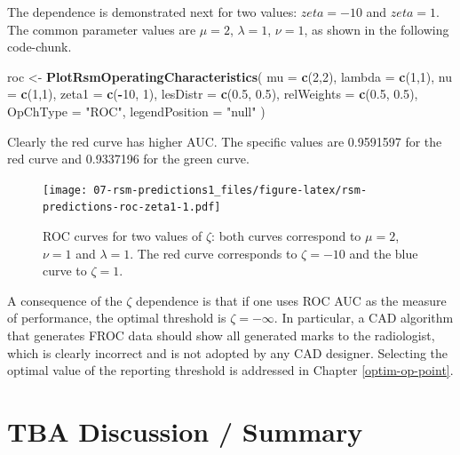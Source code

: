 \documentclass[
]{book}
\newenvironment{Shaded}{\begin{snugshade}}{\end{snugshade}}
\newcommand{\DataTypeTok}[1]{\textcolor[rgb]{0.13,0.29,0.53}{#1}}
\newcommand{\DecValTok}[1]{\textcolor[rgb]{0.00,0.00,0.81}{#1}}
\newcommand{\FloatTok}[1]{\textcolor[rgb]{0.00,0.00,0.81}{#1}}
\newcommand{\KeywordTok}[1]{\textcolor[rgb]{0.13,0.29,0.53}{\textbf{#1}}}
\newcommand{\NormalTok}[1]{#1}
\newcommand{\OperatorTok}[1]{\textcolor[rgb]{0.81,0.36,0.00}{\textbf{#1}}}
\newcommand{\StringTok}[1]{\textcolor[rgb]{0.31,0.60,0.02}{#1}}
\begin{document}
The dependence is demonstrated next for two values: \(zeta = -10\) and \(zeta = 1\). The common parameter values are \(\mu = 2\), \(\lambda = 1\), \(\nu = 1\), as shown in the following code-chunk.

\begin{Shaded}
\begin{Highlighting}[]
\NormalTok{roc <-}\StringTok{ }\KeywordTok{PlotRsmOperatingCharacteristics}\NormalTok{(}
     \DataTypeTok{mu =} \KeywordTok{c}\NormalTok{(}\DecValTok{2}\NormalTok{,}\DecValTok{2}\NormalTok{),}
     \DataTypeTok{lambda =} \KeywordTok{c}\NormalTok{(}\DecValTok{1}\NormalTok{,}\DecValTok{1}\NormalTok{),}
     \DataTypeTok{nu =} \KeywordTok{c}\NormalTok{(}\DecValTok{1}\NormalTok{,}\DecValTok{1}\NormalTok{),}
     \DataTypeTok{zeta1 =} \KeywordTok{c}\NormalTok{(}\OperatorTok{-}\DecValTok{10}\NormalTok{, }\DecValTok{1}\NormalTok{),}
     \DataTypeTok{lesDistr =} \KeywordTok{c}\NormalTok{(}\FloatTok{0.5}\NormalTok{, }\FloatTok{0.5}\NormalTok{),}
     \DataTypeTok{relWeights =} \KeywordTok{c}\NormalTok{(}\FloatTok{0.5}\NormalTok{, }\FloatTok{0.5}\NormalTok{),}
     \DataTypeTok{OpChType =} \StringTok{"ROC"}\NormalTok{,}
     \DataTypeTok{legendPosition =} \StringTok{"null"}
\NormalTok{)}
\end{Highlighting}
\end{Shaded}

Clearly the red curve has higher AUC. The specific values are 0.9591597 for the red curve and 0.9337196 for the green curve.

\begin{figure}
\centering
\texttt{[image: 07-rsm-predictions1\_files/figure-latex/rsm-predictions-roc-zeta1-1.pdf]}
\caption{\label{fig:rsm-predictions-roc-zeta1}ROC curves for two values of \(\zeta\): both curves correspond to \(\mu = 2\), \(\nu = 1\) and \(\lambda = 1\). The red curve corresponds to \(\zeta = -10\) and the blue curve to \(\zeta = 1\).}
\end{figure}

A consequence of the \(\zeta\) dependence is that if one uses ROC AUC as the measure of performance, the optimal threshold is \(\zeta = -\infty\). In particular, a CAD algorithm that generates FROC data should show all generated marks to the radiologist, which is clearly incorrect and is not adopted by any CAD designer. Selecting the optimal value of the reporting threshold is addressed in Chapter \ref{optim-op-point}.

\hypertarget{rsm-predictions-discussion-summary}{%
\section{TBA Discussion / Summary}\label{rsm-predictions-discussion-summary}}
\end{document}
